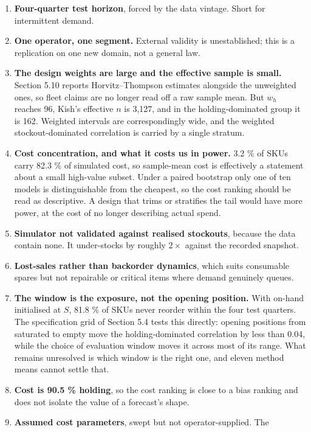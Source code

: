 \documentclass[11pt]{article}
\begin{document}
\begin{enumerate}
\item \textbf{Four-quarter test horizon}, forced by the data vintage. Short for
  intermittent demand.
\item \textbf{One operator, one segment.} External validity is unestablished;
  this is a replication on one new domain, not a general law.
\item \textbf{The design weights are large and the effective sample is small.}
  Section 5.10 reports Horvitz--Thompson estimates alongside the unweighted
  ones, so fleet claims are no longer read off a raw sample mean. But $w_h$
  reaches 96, Kish's effective $n$ is 3{,}127, and in the holding-dominated
  group it is 162. Weighted intervals are correspondingly wide, and the
  weighted stockout-dominated correlation is carried by a single stratum.
\item \textbf{Cost concentration, and what it costs us in power.} 3.2 \% of
  SKUs carry 82.3 \% of simulated cost, so sample-mean cost is effectively a
  statement about a small high-value subset. Under a paired bootstrap only one
  of ten models is distinguishable from the cheapest, so the cost ranking
  should be read as descriptive. A design that trims or stratifies the tail
  would have more power, at the cost of no longer describing actual spend.
\item \textbf{Simulator not validated against realised stockouts}, because the
  data contain none. It under-stocks by roughly $2\times$ against the recorded
  snapshot.
\item \textbf{Lost-sales rather than backorder dynamics}, which suits
  consumable spares but not repairable or critical items where demand genuinely
  queues.
\item \textbf{The window is the exposure, not the opening position.} With
  on-hand initialised at $S$, 81.8 \% of SKUs never reorder within the four
  test quarters. The specification grid of Section 5.4 tests this directly:
  opening positions from saturated to empty move the holding-dominated
  correlation by less than 0.04, while the choice of evaluation window moves
  it across most of its range. What remains unresolved is which window is the
  right one, and eleven method means cannot settle that.
\item \textbf{Cost is 90.5 \% holding}, so the cost ranking is close to a bias
  ranking and does not isolate the value of a forecast's shape.
\item \textbf{Assumed cost parameters}, swept but not operator-supplied. The

\end{enumerate}
\end{document}
